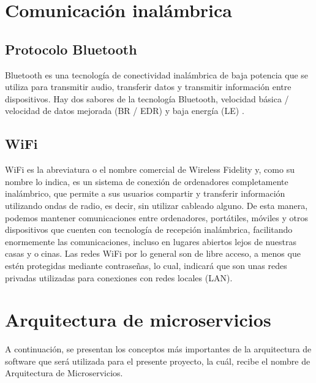 \section{Comunicación inalámbrica}
\subsection{Protocolo Bluetooth}
Bluetooth es una tecnología de conectividad inalámbrica de baja potencia que se utiliza para
transmitir audio, transferir datos y transmitir información entre dispositivos. Hay dos sabores
de la tecnología Bluetooth, velocidad básica / velocidad de datos mejorada (BR / EDR) y baja
energía (LE) \citep{Bluetooth}.
\subsection{WiFi}
WiFi es la abreviatura o el nombre comercial de Wireless Fidelity y, como su nombre lo indica,
es un sistema de conexión de ordenadores completamente inalámbrico, que permite a sus usuarios
compartir y transferir información utilizando ondas de radio, es decir, sin utilizar cableado alguno.
De esta manera, podemos mantener comunicaciones entre ordenadores, portátiles, móviles y otros
dispositivos que cuenten con tecnología de recepción inalámbrica, facilitando enormemente las
comunicaciones, incluso en lugares abiertos lejos de nuestras casas y ocinas. Las redes WiFi por
lo general son de libre acceso, a menos que estén protegidas mediante contraseñas, lo cual, indicará
que son unas redes privadas utilizadas para conexiones con redes locales (LAN)\citep{WiFi}.
\section{Arquitectura de microservicios}
A continuación, se presentan los conceptos más importantes de la arquitectura de software que será utilizada para el presente proyecto, la cuál, recibe el nombre de Arquitectura de Microservicios.
